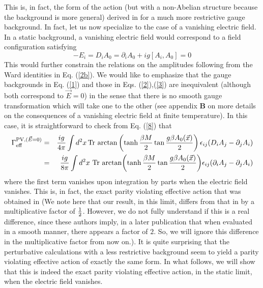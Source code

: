 \documentclass[a4paper,12pt]{article}
\begin{document}
This is, in fact, the form of the action (but with a non-Abelian
structure because the background is more general) derived 
in \cite{fosco:1997vu} for a much more restrictive gauge
background. In fact, let us now specialize to the case of a vanishing
electric field. In a static background, a vanishing
electric field would correspond to a field configuration satisfying
\begin{equation}
- E_{i} = D_{i}A_{0} = \partial_{i}A_{0} + ig \left[A_{i},A_{0}\right]
  = 0\label{3}
\end{equation}
This would further constrain the relations on the amplitudes
following from the Ward identities in Eq. (\ref{2b}). We would like to
emphasize that the gauge backgrounds in Eq. (\ref{1}) and those in
Eqs. (\ref{2}),(\ref{3}) are inequivalent (although both correspond to
$\vec{E}=0$) in the sense that there is no smooth gauge
transformation which will take one to the other (see appendix {\bf B}
on more details on the consequences of a vanishing electric field at
finite temperature). In this case, it is straightforward to check from
Eq. (\ref{8}) that
\begin{eqnarray*}
\Gamma_{\rm eff}^{{\rm PV}, (\vec{E}=0)} & = & {ig\over 4\pi} \int
d^{2}x\,{\rm
Tr}\,\arctan\left(\tanh {\beta M\over 2} \tan {g\beta
A_{0}(\vec{x})\over 2}\right)\epsilon_{ij}(D_{i}A_{j} -
\partial_{j}A_{i})\\
 & = & {ig\over 8\pi}  \int d^{2}x\ {\rm
Tr}\,\arctan\!\left(\tanh {\beta M\over 2} \tan {g\beta
A_{0}(\vec{x})\over 2}\right)\!\epsilon_{ij}(\partial_{i}A_{j} -
\partial_{j}A_{i})
\end{eqnarray*}
where the first term vanishes upon integration by parts when the
electric field vanishes. This is, in fact, the exact parity violating
effective action that was obtained in \cite{fosco:1997vu} (We note
here that our result, in this limit, differs from that in
\cite{fosco:1997vu} by a
multiplicative factor of ${1\over 2}$. However, we do not fully
understand if this is a real difference, since these authors imply, in
a later publication \cite{cdfosco} that when evaluated in a smooth
manner, there appears a factor of $2$. So, we will ignore this
difference in the multiplicative factor from now on.).  
It is quite surprising that the perturbative calculations with a less
restrictive background seem to yield a parity violating effective
action of exactly the same form. In what follows, we will show that
this  is indeed the  exact parity violating effective action, in the
static limit, when  the electric field vanishes.
\end{document}
